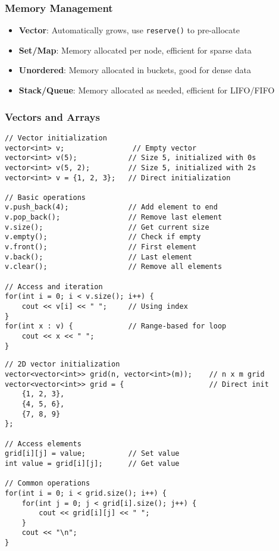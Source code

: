 \documentclass[11pt,a4paper]{article}
\begin{document}
\subsubsection{Memory Management}
\begin{itemize}
\item \textbf{Vector}: Automatically grows, use \texttt{reserve()} to pre-allocate
\item \textbf{Set/Map}: Memory allocated per node, efficient for sparse data
\item \textbf{Unordered}: Memory allocated in buckets, good for dense data
\item \textbf{Stack/Queue}: Memory allocated as needed, efficient for LIFO/FIFO
\end{itemize}

\newpage

\subsubsection{Vectors and Arrays}

\begin{lstlisting}[caption={Basic Vector Operations}]
// Vector initialization
vector<int> v;                // Empty vector
vector<int> v(5);            // Size 5, initialized with 0s
vector<int> v(5, 2);         // Size 5, initialized with 2s
vector<int> v = {1, 2, 3};   // Direct initialization

// Basic operations
v.push_back(4);              // Add element to end
v.pop_back();                // Remove last element
v.size();                    // Get current size
v.empty();                   // Check if empty
v.front();                   // First element
v.back();                    // Last element
v.clear();                   // Remove all elements

// Access and iteration
for(int i = 0; i < v.size(); i++) {
    cout << v[i] << " ";     // Using index
}
for(int x : v) {             // Range-based for loop
    cout << x << " ";
}
\end{lstlisting}

\begin{lstlisting}[caption={2D Vector Operations}]
// 2D vector initialization
vector<vector<int>> grid(n, vector<int>(m));    // n x m grid
vector<vector<int>> grid = {                    // Direct init
    {1, 2, 3},
    {4, 5, 6},
    {7, 8, 9}
};

// Access elements
grid[i][j] = value;          // Set value
int value = grid[i][j];      // Get value

// Common operations
for(int i = 0; i < grid.size(); i++) {
    for(int j = 0; j < grid[i].size(); j++) {
        cout << grid[i][j] << " ";
    }
    cout << "\n";
}
\end{lstlisting}
\end{document}
